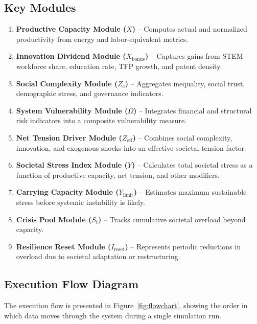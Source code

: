 \documentclass[12pt,a4paper]{article}
\begin{document}
\subsection{Key Modules}
\begin{enumerate}
    \item \textbf{Productive Capacity Module (\(X\))} – Computes actual and normalized productivity from energy and labor-equivalent metrics.
    \item \textbf{Innovation Dividend Module (\(X_{\text{bonus}}\))} – Captures gains from STEM workforce share, education rate, TFP growth, and patent density.
    \item \textbf{Social Complexity Module (\(Z_c\))} – Aggregates inequality, social trust, demographic stress, and governance indicators.
    \item \textbf{System Vulnerability Module (\(\Omega\))} – Integrates financial and structural risk indicators into a composite vulnerability measure.
    \item \textbf{Net Tension Driver Module (\(Z_{\mathrm{eff}}\))} – Combines social complexity, innovation, and exogenous shocks into an effective societal tension factor.
    \item \textbf{Societal Stress Index Module (\(Y\))} – Calculates total societal stress as a function of productive capacity, net tension, and other modifiers.
    \item \textbf{Carrying Capacity Module (\(Y_{\mathrm{limit}}\))} – Estimates maximum sustainable stress before systemic instability is likely.
    \item \textbf{Crisis Pool Module (\(S_t\))} – Tracks cumulative societal overload beyond capacity.
    \item \textbf{Resilience Reset Module (\(I_{\mathrm{reset}}\))} – Represents periodic reductions in overload due to societal adaptation or restructuring.
\end{enumerate}

\subsection{Execution Flow Diagram}
The execution flow is presented in Figure~\ref{fig:flowchart}, showing the order in which data moves through the system during a single simulation run.
\end{document}
